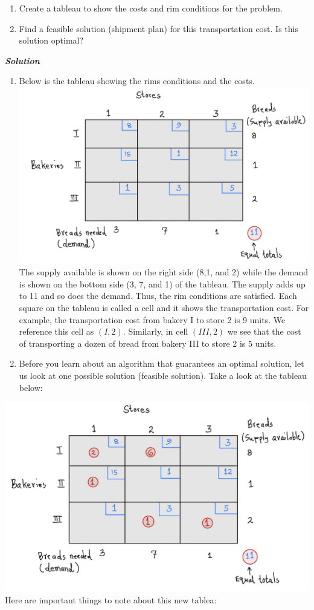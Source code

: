 \documentclass[
  letterpaper,
  DIV=11,
  numbers=noendperiod]{scrreprt}
\providecommand{\tightlist}{%
  \setlength{\itemsep}{0pt}\setlength{\parskip}{0pt}}\usepackage{longtable,booktabs,array}
\begin{document}
\begin{enumerate}
\def\labelenumi{\alph{enumi})}
\tightlist
\item
  Create a tableau to show the costs and rim conditions for the problem.
\item
  Find a feasible solution (shipment plan) for this transportation cost.
  Is this solution optimal?
\end{enumerate}

\textbf{\emph{Solution}}

\begin{enumerate}
\def\labelenumi{\alph{enumi})}
\item
  Below is the tableau showing the rims conditions and the costs.
  \includegraphics{images/j.jpeg} The supply available is shown on the
  right side (8,1, and 2) while the demand is shown on the bottom side
  (3, 7, and 1) of the tableau. The supply adds up to 11 and so does the
  demand. Thus, the rim conditions are satisfied. Each square on the
  tableau is called a cell and it shows the transportation cost. For
  example, the transportation cost from bakery I to store 2 is 9 units.
  We reference this cell as \((I,2)\). Similarly, in cell \((III,2)\) we
  see that the cost of transporting a dozen of bread from bakery III to
  store 2 is 5 units.
\item
  Before you learn about an algorithm that guarantees an optimal
  solution, let us look at one possible solution (feasible solution).
  Take a look at the tableau below:
\end{enumerate}

\includegraphics{images/k.jpeg} Here are important things to note about
this new tablea:
\end{document}

